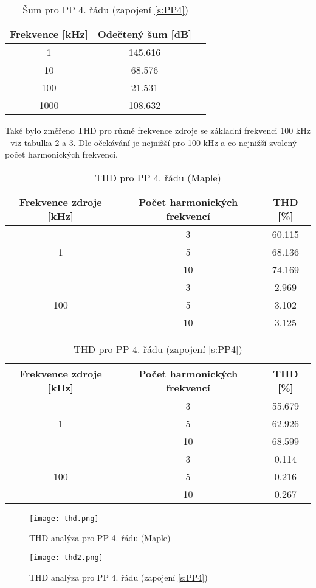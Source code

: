   \begin{table}[h]
\centering
  \begin{tabular}{ | c | c | c |}
    \hline
     Frekvence [kHz] & Odečtený šum [dB] \\ \hline
    1 & 145.616 \\ \hline
    10 & 68.576 \\ \hline
    100 & 21.531 \\ \hline
    1000 & 108.632 \\ \hline
  \end{tabular}
\caption[Šum pro PP 4. řádu]{Šum pro PP 4. řádu (zapojení \ref{s:PP4}) \label{s:THD2}}
\end{table}
\noindent Také bylo změřeno THD pro různé frekvence zdroje se základní frekvenci 100 kHz - viz tabulka \ref{s:THD3} a \ref{s:THD4}. Dle očekávání je nejnižší pro 100 kHz a co nejnižší zvolený počet harmonických frekvencí.
\begin{table}[h]
\centering
\renewcommand{\arraystretch}{1.15}
  \begin{tabular}{ | c | c | c |}
    \hline
    Frekvence zdroje [kHz] & Počet harmonických frekvencí & THD [\%] \\ \hline
    \multirow{3}{*}{1} & 3 & 60.115 \\& 5 & 68.136 \\& 10 & 74.169 \\ \hline
	\multirow{3}{*}{100} & 3 & 2.969\\& 5 & 3.102 \\& 10 & 3.125 \\ \hline
  \end{tabular}
  \caption[THD pro PP 4. řádu (Maple)]{THD pro PP 4. řádu (Maple) \label{s:THD3}}
\end{table}
\begin{table}[h]
\centering
\renewcommand{\arraystretch}{1.15}
  \begin{tabular}{ | c | c | c |} 
    \hline
     Frekvence zdroje [kHz] & Počet harmonických frekvencí & THD [\%] \\ \hline
    \multirow{3}{*}{1} & 3 & 55.679 \\& 5 & 62.926 \\& 10 & 68.599 \\ \hline
	\multirow{3}{*}{100} & 3 & 0.114\\& 5 & 0.216 \\& 10 & 0.267 \\ \hline
  \end{tabular}
  \caption[THD pro PP 4. řádu]{THD pro PP 4. řádu (zapojení \ref{s:PP4}) \label{s:THD4}}
\end{table}
\begin{figure}[h]
\centering
\texttt{[image: thd.png]}
\caption[THD analýza pro PP 4. řádu (Maple)]{THD analýza pro PP 4. řádu (Maple)}
\end{figure}
\begin{figure}[h]
\centering
\texttt{[image: thd2.png]}
\caption[THD analýza pro PP 4. řádu (zapojení \ref{s:PP4})]{THD analýza pro PP 4. řádu (zapojení \ref{s:PP4})}
\end{figure}